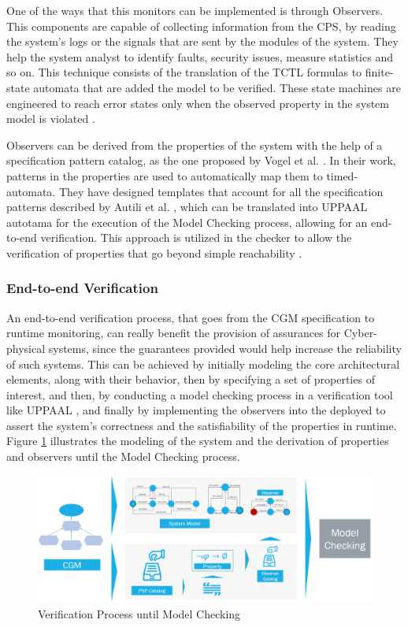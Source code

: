 One of the ways that this monitors can be implemented is through Observers. This components are capable of collecting information from the CPS, by reading the system's logs or the signals that are sent by the modules of the system. They help the system analyst to identify faults, security issues, measure statistics and so on. This technique consists of the translation of the TCTL formulas to finite-state automata that are added the model to be verified. These state machines are engineered to reach error states only when the observed property in the system model is violated \cite{1999Observers}. 


Observers can be derived from the properties of the system with the help of a specification pattern catalog, as the one proposed by Vogel et al. \cite{2022PSP}. In their work, patterns in the properties are used to automatically map them to timed-automata. They have designed templates that account for all the specification patterns described by Autili et al. \cite{2015PropertySpecCatalog}, which can be translated into UPPAAL \cite{UPPAAL} autotama for the execution of the Model Checking process, allowing for an end-to-end verification. This approach is utilized in the checker to allow the verification of properties that go beyond simple reachability \cite{1998ReachabilityObs}. 

\subsubsection{End-to-end Verification}

An end-to-end verification process, that goes from the CGM specification to runtime monitoring, can really benefit the provision of assurances for Cyber-physical systems, since the guarantees provided would help increase the reliability of such systems. This can be achieved by initially modeling the core architectural elements, along with their behavior, then by specifying a set of properties of interest, and then, by conducting a model checking process in a verification tool like UPPAAL \cite{UPPAAL}, and finally by implementing the observers into the deployed to assert the system's correctness and the satisfiability of the properties in runtime. Figure \ref{fig:ver_model_checking} illustrates the modeling of the system and the derivation of properties and observers until the Model Checking process.

\begin{figure}[!htb]
 \centering
 \includegraphics[width=\linewidth]{img/verification_process.png}
 \caption{Verification Process until Model Checking}
\label{fig:ver_model_checking}
\end{figure} 

